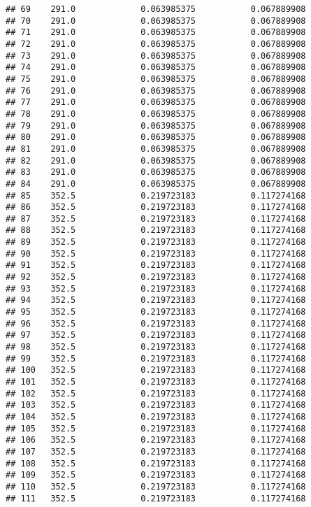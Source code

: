 \documentclass[]{article}
\begin{document}
\begin{verbatim}
## 69    291.0             0.063985375           0.067889908
## 70    291.0             0.063985375           0.067889908
## 71    291.0             0.063985375           0.067889908
## 72    291.0             0.063985375           0.067889908
## 73    291.0             0.063985375           0.067889908
## 74    291.0             0.063985375           0.067889908
## 75    291.0             0.063985375           0.067889908
## 76    291.0             0.063985375           0.067889908
## 77    291.0             0.063985375           0.067889908
## 78    291.0             0.063985375           0.067889908
## 79    291.0             0.063985375           0.067889908
## 80    291.0             0.063985375           0.067889908
## 81    291.0             0.063985375           0.067889908
## 82    291.0             0.063985375           0.067889908
## 83    291.0             0.063985375           0.067889908
## 84    291.0             0.063985375           0.067889908
## 85    352.5             0.219723183           0.117274168
## 86    352.5             0.219723183           0.117274168
## 87    352.5             0.219723183           0.117274168
## 88    352.5             0.219723183           0.117274168
## 89    352.5             0.219723183           0.117274168
## 90    352.5             0.219723183           0.117274168
## 91    352.5             0.219723183           0.117274168
## 92    352.5             0.219723183           0.117274168
## 93    352.5             0.219723183           0.117274168
## 94    352.5             0.219723183           0.117274168
## 95    352.5             0.219723183           0.117274168
## 96    352.5             0.219723183           0.117274168
## 97    352.5             0.219723183           0.117274168
## 98    352.5             0.219723183           0.117274168
## 99    352.5             0.219723183           0.117274168
## 100   352.5             0.219723183           0.117274168
## 101   352.5             0.219723183           0.117274168
## 102   352.5             0.219723183           0.117274168
## 103   352.5             0.219723183           0.117274168
## 104   352.5             0.219723183           0.117274168
## 105   352.5             0.219723183           0.117274168
## 106   352.5             0.219723183           0.117274168
## 107   352.5             0.219723183           0.117274168
## 108   352.5             0.219723183           0.117274168
## 109   352.5             0.219723183           0.117274168
## 110   352.5             0.219723183           0.117274168
## 111   352.5             0.219723183           0.117274168

\end{verbatim}
\end{document}
